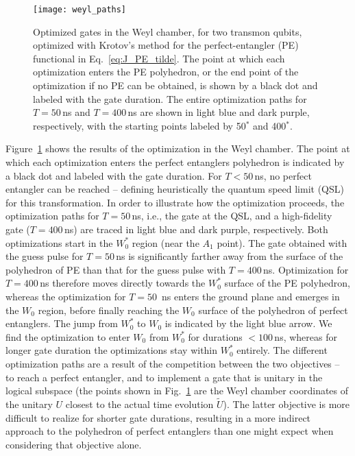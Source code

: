 \begin{figure}[tb]
  \centering
  \texttt{[image: weyl\_paths]}
  \caption{Optimized gates in the Weyl chamber, for two transmon qubits,
  optimized with Krotov's method for the perfect-entangler (PE) functional in
  Eq.~\eqref{eq:J_PE_tilde}.
  The point at which each optimization enters the PE polyhedron, or the
  end point of the optimization if no PE can be obtained,
  is shown by a black dot and labeled with the gate duration.
  The entire optimization paths for  $T=50\,$ns and $T=400\,$ns are
  shown in light blue and dark purple, respectively, with the
  starting points labeled by 50$^*$ and 400$^*$.}
  \label{fig:transmon_weyl_paths}
\end{figure}
Figure~\ref{fig:transmon_weyl_paths} shows the results of the
optimization in the Weyl chamber. The point at which each optimization
enters the perfect entanglers
polyhedron is indicated by a black dot and labeled
with the gate duration. For $T<50\,$ns, no perfect entangler can be
reached -- defining heuristically the quantum speed limit (QSL) for this
transformation.
%
In order to illustrate how the optimization proceeds,
the optimization paths for $T=50\,$ns, i.e., the gate at the
QSL, and a high-fidelity gate ($T=400\,$ns) are traced in light blue
and dark purple, respectively. Both optimizations start
in the $W_0^*$ region (near the $A_1$ point). The gate obtained with
the guess pulse for
$T=50\,$ns is significantly farther away from the surface of the
polyhedron of PE than that for the guess pulse with $T=400\,$ns.
Optimization for $T=400\,$ns therefore
moves directly towards the $W_0^*$ surface of the
PE polyhedron, whereas the optimization for $T=50$~ns enters the
ground plane and emerges in the $W_0$ region, before finally
reaching the $W_0$ surface of the polyhedron of perfect entanglers. The jump
from $W_0^*$ to $W_0$ is indicated by the light blue arrow. We find
the optimization to enter $W_0$ from $W_0^*$ for
durations $< 100\,$ns,  whereas for longer gate duration the optimizations
stay within $W_0^*$ entirely. The different optimization paths are a
result of the competition between the two objectives -- to reach a
perfect entangler, and to implement a gate that is unitary in the
logical subspace (the points shown in
Fig.~\ref{fig:transmon_weyl_paths} are the Weyl chamber
coordinates of the unitary $U$ closest to the actual time evolution
$\tilde{U}$). The latter objective is more difficult to realize
for shorter gate durations, resulting in a more indirect approach to
the polyhedron of perfect entanglers than one might expect when
considering that objective alone.


